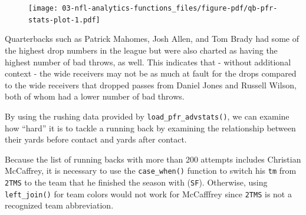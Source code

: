 \documentclass[
  letterpaper,
]{krantz}
\begin{document}
\begin{figure}[H]

{\centering \texttt{[image: 03-nfl-analytics-functions\_files/figure-pdf/qb-pfr-stats-plot-1.pdf]}

}

\end{figure}

Quarterbacks such as Patrick Mahomes, Josh Allen, and Tom Brady had some
of the highest drop numbers in the league but were also charted as
having the highest number of bad throws, as well. This indicates that -
without additional context - the wide receivers may not be as much at
fault for the drops compared to the wide receivers that dropped passes
from Daniel Jones and Russell Wilson, both of whom had a lower number of
bad throws.

By using the rushing data provided by \texttt{load\_pfr\_advstats()}, we
can examine how ``hard'' it is to tackle a running back by examining the
relationship between their yards before contact and yards after contact.

\begin{tcolorbox}[enhanced jigsaw, colback=white, leftrule=.75mm, breakable, colframe=quarto-callout-important-color-frame, bottomtitle=1mm, rightrule=.15mm, left=2mm, opacityback=0, bottomrule=.15mm, arc=.35mm, coltitle=black, colbacktitle=quarto-callout-important-color!10!white, toptitle=1mm, titlerule=0mm, title=\textcolor{quarto-callout-important-color}{\faExclamation}\hspace{0.5em}{Important}, toprule=.15mm, opacitybacktitle=0.6]

Because the list of running backs with more than 200 attempts includes
Christian McCaffrey, it is necessary to use the \texttt{case\_when()}
function to switch his \texttt{tm} from \texttt{2TMS} to the team that
he finished the season with (\texttt{SF}). Otherwise, using
\texttt{left\_join()} for team colors would not work for McCafffrey
since \texttt{2TMS} is not a recognized team abbreviation.

\end{tcolorbox}
\end{document}
